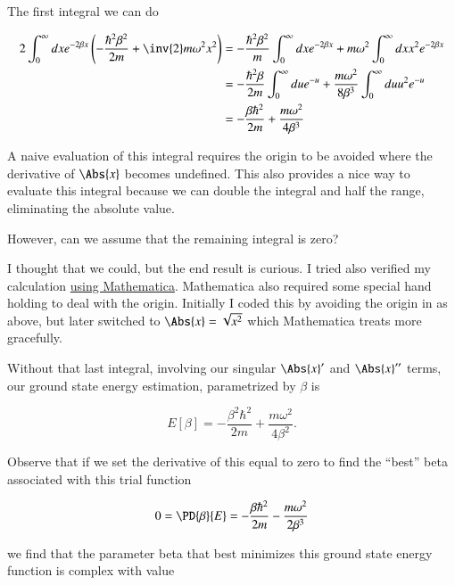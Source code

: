 The first integral we can do

\begin{align*}
2 \int_{0}^\infty dx
e^{- 2 \beta x} 
\left( -\frac{\hbar^2 \beta^2}{2m} + \inv{2} m \omega^2 x^2 \right)
&= 
-\frac{\hbar^2 \beta^2}{m} 
\int_{0}^\infty dx e^{- 2 \beta x} 
+ m \omega^2 
 \int_{0}^\infty dx x^2 e^{- 2 \beta x}  \\
&= 
-\frac{\hbar^2 \beta}{2 m} 
\int_{0}^\infty du e^{- u} 
+ \frac{m \omega^2 }{8 \beta^3}
 \int_{0}^\infty du u^2 e^{- u}  \\
&=
-\frac{\beta \hbar^2}{2m} + \frac{m \omega^2}{4 \beta^3}
\end{align*}

A naive evaluation of this integral requires the origin to be avoided where the derivative of $\Abs{x}$ becomes undefined.  This also provides a nice way to evaluate this integral because we can double the integral and half the range, eliminating the absolute value.

However, can we assume that the remaining integral is zero?

I thought that we could, but the end result is curious.  I tried also verified my calculation \href{https://github.com/peeterjoot/physicsplay/tree/master/notes/phy456/24.4.3 attempt with mathematica.nb}{using Mathematica}.  Mathematica also required some special hand holding to deal with the origin.  Initially I coded this by avoiding the origin in as above, but later switched to $\Abs{x} = \sqrt{x^2}$ which Mathematica treats more gracefully.

Without that last integral, involving our singular $\Abs{x}'$ and $\Abs{x}''$ terms, our ground state energy estimation, parametrized by $\beta$ is

\begin{equation}\label{eqn:variationHarmonicOscillator:190}
E[\beta] = -\frac{\beta^2 \hbar^2}{2m} + \frac{m \omega^2}{4 \beta^2}.
\end{equation}

Observe that if we set the derivative of this equal to zero to find the ``best'' beta associated with this trial function

\begin{equation}\label{eqn:variationHarmonicOscillator:210}
0 = \PD{\beta}{E} = -\frac{\beta \hbar^2}{2m} - \frac{m \omega^2}{2 \beta^3}
\end{equation}

we find that the parameter beta that best minimizes this ground state energy function is complex with value

